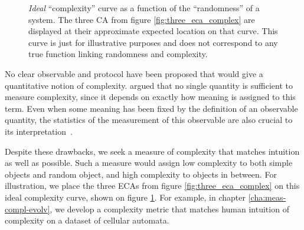 \begin{figure}[htbp]
  \centering
\caption{\emph{Ideal} ``complexity'' curve as a function of the ``randomness''
  of a system. The three \ac{CA} from figure \ref{fig:three_eca_complex} are
  displayed at their approximate expected location on that curve. This curve is
  just for illustrative purposes and does not correspond to any true function
  linking randomness and complexity.}
\label{fig:complexity_curve}
\end{figure}

No clear observable and protocol have been proposed that would give a
quantitative notion of complexity.
\textcite{grassbergerProblemsQuantifyingSelfgenerated1989} argued that no single
quantity is sufficient to measure complexity, since it depends on exactly how
meaning is assigned to this term. Even when some meaning has been fixed by the
definition of an observable quantity, the statistics of the measurement of this
observable are also crucial to its
interpretation~\parencite{gutowitzCellularAutomataSciences1995}.

Despite these drawbacks, we seek a measure of complexity that matches intuition
as well as possible. Such a measure would assign low complexity to both simple
objects and random object, and high complexity to objects in between. For
illustration, we place the three \acp{ECA} from figure
\ref{fig:three_eca_complex} on this ideal complexity curve, shown on figure
\ref{fig:complexity_curve}. For example, in chapter \ref{cha:meas-compl-evolv},
we develop a complexity metric that matches human intuition of complexity on a
dataset of cellular automata.

